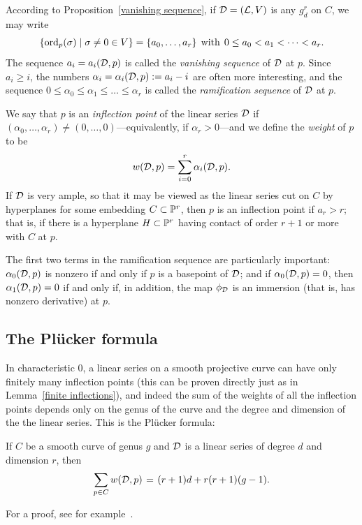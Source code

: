 According to  Proposition~\ref{vanishing sequence}, if ${\mathcal D} = ({\mathcal L}, V)$ is any $g^r_d$ on $C$, we may write
$$
\{ \ord_p(\sigma) \mid \sigma \neq 0 \in V \} = \{a_0,\dots,a_r\} \; \text{ with } \; 0\leq a_0 < a_1 < \dots < a_r.
$$
The sequence $a_i = a_i({\mathcal D},p)$ is called the \emph{vanishing sequence} of ${\mathcal D}$ at $p$.  Since $a_i \geq i$, the numbers $\alpha_i = \alpha_i({\mathcal D},p) := a_i - i$ are often more interesting, and the sequence $0 \leq \alpha_0 \leq \alpha_1 \leq \dots \leq \alpha_r$ is called the \emph{ramification sequence} of ${\mathcal D}$ at $p$. 

We say that $p$ is an \emph{inflection point} of the linear series ${\mathcal D}$ if $(\alpha_0,\dots,\alpha_r) \neq (0,\dots,0)$---equivalently, if $\alpha_r > 0$---and we define the \emph{weight} of $p$ to be
$$
w({\mathcal D}, p) = \sum_{i=0}^r \alpha_i({\mathcal D}, p).
$$
If ${\mathcal D}$ is very ample, so that it may be viewed as the linear series cut on $C$ by hyperplanes for some embedding $C \subset \mathbb P^r$, then $p$ is an inflection point if $a_r > r$; that is, if there is a hyperplane $H \subset \mathbb P^r$ having contact of order $r+1$ or more with $C$ at $p$. 

The first two terms in the ramification sequence are particularly important: $\alpha_0({\mathcal D}, p)$ is nonzero if and only if $p$ is a basepoint of ${\mathcal D}$; and if $\alpha_0({\mathcal D}, p)=0$, then $\alpha_1({\mathcal D}, p) = 0$ if and only if, in addition, the map $\phi_{\mathcal D}$ is an immersion (that is, has nonzero derivative) at $p$.


\subsection{The Pl\"ucker formula}

In characteristic 0, a linear series on a smooth projective curve can have only finitely many inflection points (this can be proven
directly just as in Lemma~\ref{finite inflections}), and indeed the sum of the weights of all the inflection points depends only on the genus of the curve and the degree and dimension of the the linear series. This is the Pl\"ucker formula:

\begin{theorem}\label{Plucker}
If $C$ be a smooth curve of genus $g$ and ${\mathcal D}$ is a
linear series of degree $d$ and dimension $r$, then
 \begin{equation}\label{Plucker formula}
\sum_{p \in C} w(\cD, p) \; = \; (r+1)d + r(r+1)(g-1).
\end{equation}
\end{theorem}
For a proof, see for example~\cite[Theorem 7.13]{allthat}.

